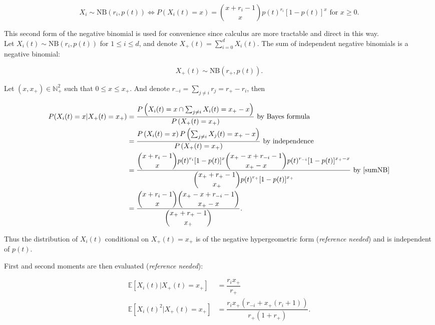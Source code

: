 \documentclass{article}
\begin{document}
\begin{equation}
X_i \sim \textrm{NB}(r_i,p(t)) \iff P(X_i(t)=x)=\binom{x+r_i-1}{x} p(t)^{r_i} [1-p(t)]^{x} \text{ for } x \geq 0.
\end{equation}

This second form of the negative binomial is used for convenience since calculus are more tractable and direct in this way.\\


Let $X_i(t) \sim \textrm{NB}(r_i,p(t))$ for $1 \leq i \leq d$, and denote $X_+(t)=\sum_{i=0}^d X_i(t)$. The sum of independent negative binomials is a negative binomial:

\begin{equation}
 X_+(t)  \sim \textrm{NB} \left( r_+, p(t) \right). \label{sumNB}
\end{equation}


Let $(x,x_+) \in \mathbb{N}_+^2$ such that $0 \leq x \leq x_+$. And denote $ \displaystyle r_{-i}=\sum_{j \neq i} r_j=r_+-r_i$, then

\begin{align}
P( X_i(t)=x \vert X_+(t)=x_+ ) &=\dfrac{P\left( X_i(t)=x \cap \sum_{j \neq i} X_i(t)=x_+-x \right)}{P\left(X_+(t)=x_+\right)} \text{ by Bayes formula}\\
 &=\dfrac{P\left(X_i(t)=x\right) P\left(\sum_{j \neq i} X_j(t)=x_+-x\right)}{P\left(X_+(t)=x_+\right)} \text{ by independence}\\
 &=\dfrac{\displaystyle \binom{x+r_i-1}{x} p(t)^{r_i} [1-p(t)]^{x} \binom{x_+-x+r_{-i}-1}{x_+-x} p(t)^{r_{-i}} [1-p(t)]^{x_+-x} }{\displaystyle \binom{x_++r_+ -1}{x_+} p(t)^{r_+ } [1-p(t)]^{x_+}} \text{ by \eqref{sumNB}} \\
 &=\dfrac{\displaystyle \binom{x+r_i-1}{x} \binom{x_+-x+r_{-i}-1}{x_+-x}}{\displaystyle \binom{x_+ +r_+ -1}{x_+}}.
\end{align}
 
 Thus the distribution of $X_i(t)$ conditional on $ X_+(t)=x_+$ is of the negative hypergeometric form (\textit{reference needed}) and is independent of $p(t)$.
 
 First and second moments are then evaluated (\textit{reference needed}): 
 
\begin{align}
\mathbb{E} [ X_i(t) \vert X_+(t)=x_+ ] &=\dfrac{r_i x_+}{r_+ } \\
\mathbb{E} [ X_i(t)^2 \vert X_+(t)=x_+ ] &=\dfrac{r_i x_+ (r_{-i} +x_+ (r_i+1))}{r_+ (1+r_+ )}.
\end{align}
\end{document}
